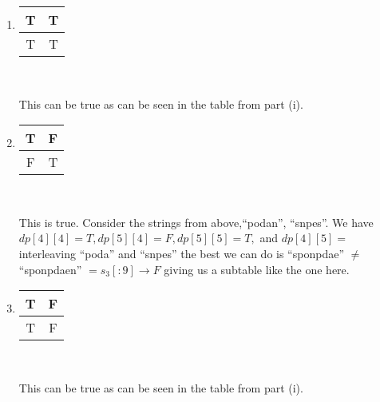 \documentclass[11pt]{article}
\begin{document}
\begin{enumerate}[(a)]
\begin{enumerate}[(i)]
        \begin{enumerate}[1.]
            \item 
            \begin{tabular}{ |c|c| } 
            \hline
            T & T \\ 
            \hline
            T & T \\
            \hline
            \end{tabular}\\
            \begin{solution}
                This can be true as can be seen in the table from part (i).
            \end{solution}
            \item 
            \begin{tabular}{ |c|c| } 
            \hline
            T & F \\ 
            \hline
            F & T \\
            \hline
            \end{tabular}\\
            \begin{solution}
                This is true. Consider the strings from above,``podan'', ``snpes''.
                We have $dp[4][4] = T, dp[5][4] = F, dp[5][5] = T,$ and $dp[4][5] =$ interleaving ``poda'' and ``snpes'' the best we can do is ``sponpdae'' $\ne$ ``sponpdaen'' $ = s_3[:9] \rightarrow F$
                giving us a subtable like the one here.
            \end{solution}
            \item 
            \begin{tabular}{ |c|c| } 
            \hline
            T & F \\ 
            \hline
            T & F \\
            \hline
            \end{tabular}\\
            \begin{solution}
                This can be true as can be seen in the table from part (i).
            \end{solution}

        \end{enumerate}
    \end{enumerate}
    
\end{enumerate}
\end{document}
